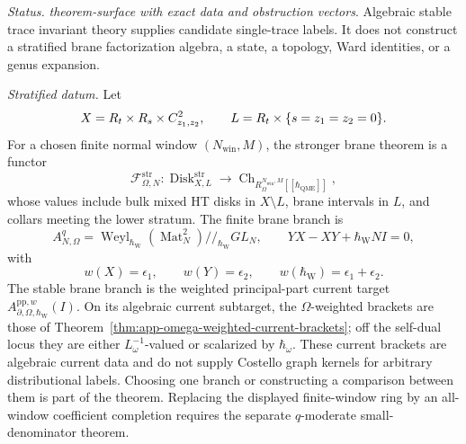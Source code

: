 \begin{stmt}\label{thm:lane-stratified-trace-physical-large-n}
  \emph{Status.} \emph{theorem-surface with exact data and obstruction
  vectors}.  Algebraic stable trace invariant theory supplies candidate
  single-trace labels.  It does not construct a stratified brane
  factorization algebra, a state, a topology, Ward identities, or a
  genus expansion.

  \emph{Stratified datum.} Let
  \[
    X=R_t\times R_s\times C^2_{z_1,z_2},\qquad
    L=R_t\times\{s=z_1=z_2=0\}.
  \]
  For a chosen finite normal window \((N_{\mathrm{win}},M)\), the
  stronger brane theorem is a functor
  \[
    \mathcal F^{\mathrm{str}}_{\Omega,N}\colon
    \operatorname{Disk}^{\mathrm{str}}_{X,L}
    \longrightarrow
    \operatorname{Ch}_{R_{\Omega}^{N_{\mathrm{win}},M}
    [[\hbar_{\mathrm{QME}}]]},
  \]
  whose values include bulk mixed HT disks in \(X\setminus L\), brane
  intervals in \(L\), and collars meeting the lower stratum.  The finite
  brane branch is
  \[
    A^q_{N,\Omega}
    =
    \operatorname{Weyl}_{\hbar_{\mathrm{W}}}
    (\operatorname{Mat}_N^2)//_{\hbar_{\mathrm{W}}} GL_N,
    \qquad
    YX-XY+\hbar_{\mathrm{W}}NI=0,
  \]
  with
  \[
    w(X)=\epsilon_1,\qquad
    w(Y)=\epsilon_2,\qquad
    w(\hbar_{\mathrm{W}})=\epsilon_1+\epsilon_2.
  \]
  The stable brane branch is the weighted principal-part current target
  \(A^{\mathrm{pp},w}_{\partial,\Omega,\hbar_{\mathrm{W}}}(I)\).  On its
  algebraic current subtarget, the \(\Omega\)-weighted brackets are those
  of Theorem~\ref{thm:app-omega-weighted-current-brackets}; off the
  self-dual locus they are either \(L_\omega^{-1}\)-valued or scalarized
  by \(\hbar_\omega\).  These current brackets are algebraic current data
  and do not supply Costello graph kernels for arbitrary distributional
  labels.  Choosing one branch or constructing a comparison between them
  is part of the theorem.  Replacing the displayed finite-window ring by
  an all-window coefficient completion requires the separate
  \(q\)-moderate small-denominator theorem.


\end{stmt}
